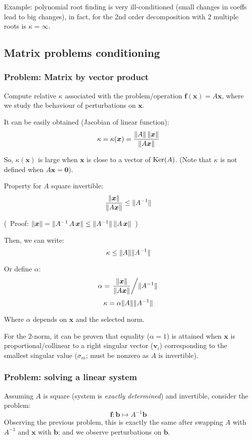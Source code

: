 \documentclass[
  12pt,
  paper=a4,
]{scrartcl} %
\begin{document}
Example: polynomial root finding is very ill-conditioned (small changes in coeffs lead to big changes), in fact, for the 2nd order decomposition with 2 multiple roots is $\kappa = \infty$.

\subsection*{Matrix problems conditioning}

\subsubsection*{Problem: Matrix by vector product}

Compute relative $\kappa$ associated with the problem/operation $\bm f(\bm x) = A \bm x$, where we study the behaviour of perturbations on $\bm x$.

It can be easily obtained (Jacobian of linear function):
\[
\kappa = \kappa(\bm x) =  \frac{\|A\|\,\|\bm x\|}{\|A\bm x\|}
\]

So, $\kappa(\bm x)$ is large when $\bm x$ is close to a vector of $\operatorname{Ker}(A)$. (Note that $\kappa$ is not defined when $A\bm x=\bm 0$).

Property for $A$ square invertible: \[\frac{\|\bm x\|}{\|A\bm x\|} \le \|A^{-1}\| \]

(\,\! Proof: $
    \|\bm x\| = \|A^{-1}\, A\, \bm x\|
    \le \|A^{-1}\|\, \|A\, \bm x\|
$ \,\!)

Then, we can write: \[\kappa \le \|A\|\|A^{-1}\| \]

Or define $\alpha$:
\[\alpha =
\left.
    \frac{\|\bm x\|}{\|A\bm x\|}
        \middle /
    \|A^{-1}\|
\right.    
\]
\[\kappa = \alpha \|A\|\|A^{-1}\| \]

Where $\alpha$ depends on $\bm x$ and the selected norm.

For the $2$-norm, it can be proven that equality ($\alpha=1$) is attained when $\bm x$ is proportional/collinear to a right singular vector ($\bm v_i$) corresponding to the smallest singular value ($\sigma_m$; must be nonzero as $A$ is invertible).

\subsubsection*{Problem: solving a linear system}

Assuming $A$ is square (system is \emph{exactly determined}) and invertible, consider the problem:
\[
    \bm f : \bm b \mapsto A^{-1}\bm b
\]
Observing the previous problem, this is exactly the same after swapping $A$ with $A^{-1}$ and $\bm x$ with $\bm b$; and we observe perturbations on $\bm b$.
\end{document}
